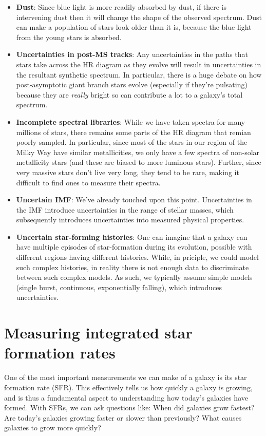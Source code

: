 \documentclass[11pt]{article}
\begin{document}
\begin{itemize}
\item {\bf Dust}: Since blue light is more readily absorbed by dust,
  if there is intervening dust then it will change the shape of the
  observed spectrum. Dust can make a population of stars look older
  than it is, because the blue light from the young stars is absorbed.
\item {\bf Uncertainties in post-MS tracks}: Any uncertainties in the
  paths that stars take across the HR diagram as they evolve will
  result in uncertainties in the resultant synthetic spectrum. In
  particular, there is a huge debate on how post-asymptotic giant
  branch stars evolve (especially if they're pulsating) because they
  are {\it really} bright so can contribute a lot to a galaxy's total
  spectrum.
\item {\bf Incomplete spectral libraries}: While we have taken spectra
  for many millions of stars, there remains some parts of the HR
  diagram that remian poorly sampled. In particular, since most of the
  stars in our region of the Milky Way have similar metallicities, we
  only have a few spectra of non-solar metallicity stars (and these
  are biased to more luminous stars). Further, since very massive
  stars don't live very long, they tend to be rare, making it
  difficult to find ones to measure their spectra.
\item {\bf Uncertain IMF}: We've already touched upon this
  point. Uncertainties in the IMF introduce uncertainties in the range
  of stellar masses, which subsequently introduces uncertainties into
  measured physical properties.
\item {\bf Uncertain star-forming histories}: One can imagine that a
  galaxy can have multiple episodes of star-formation during its
  evolution, possible with different regions having different
  histories. While, in priciple, we could model such complex
  histories, in reality there is not enough data to discriminate
  between such complex models. As such, we typically assume simple
  models (single burst, continuous, exponentially falling), which
  introduces uncertainties.
\end{itemize}

\section{Measuring integrated star formation rates}
\label{SFR}
One of the most important measurements we can make of a galaxy is its
star formation rate (SFR). This effectively tells us how quickly a
galaxy is growing, and is thus a fundamental aspect to understanding
how today's galaxies have formed. With SFRs, we can ask questions
like: When did galaxies grow fastest? Are today's galaxies growing
faster or slower than previously? What causes galaxies to grow more
quickly?
\end{document}

